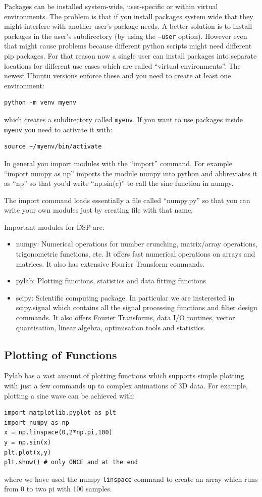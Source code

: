 \documentclass[12pt,a4paper]{article}
\begin{document}
Packages can be installed system-wide, user-specific or within
virtual environments. The problem is that if you install packages
system wide that they might interfere with another user's package
needs. A better solution is to install packages in the user's
subdirectory (by using the \texttt{--user} option). However even
that might cause problems because different python scripts might
need different pip packages. For that reason now a single user
can install packages into separate locations for different use
cases which are called ``virtual environments''. The newest Ubuntu
versions enforce these and you need to create at least one environment:
\begin{verbatim}
python -m venv myenv
\end{verbatim}
which creates a subdirectory called \texttt{myenv}. If you want
to use packages inside \texttt{myenv} you need to activate it with:
\begin{verbatim}
source ~/myenv/bin/activate
\end{verbatim}

In general you import modules with the ``import'' command. For example
``import numpy as np'' imports the module numpy into python and
abbreviates it as ``np'' so that you'd write ``np.sin(c)'' to call the
sine function in numpy.

The import command loads essentially a file
called ``numpy.py'' so that you can write your own modules just by
creating file with that name.

Important modules for DSP are:
\begin{itemize}
\item numpy: Numerical operations for number crunching, matrix/array
  operations, trigonometric functions, etc. It offers fast numerical
  operations on arrays and matrices. It also has extensive Fourier
  Transform commands.
\item pylab: Plotting functions, statistics and data fitting functions
\item scipy: Scientific computing package. In particular we are insterested in
  scipy.signal which contains all the signal processing functions and
  filter design commands. It also offers Fourier Transforms, data I/O routines,
  vector quantisation, linear algebra, optimisation tools and statistics.
\end{itemize}

\subsection{Plotting of Functions}
Pylab has a vast amount of plotting functions which supports simple plotting
with just a few commands up to complex animations of 3D data.
For example, plotting a sine wave can be achieved with:
\begin{verbatim} 
import matplotlib.pyplot as plt
import numpy as np
x = np.linspace(0,2*np.pi,100)
y = np.sin(x)
plt.plot(x,y)
plt.show() # only ONCE and at the end
\end{verbatim}
where we have used the numpy \texttt{linspace} command to create an array which
runs from 0 to two pi with 100 samples.
\end{document}
